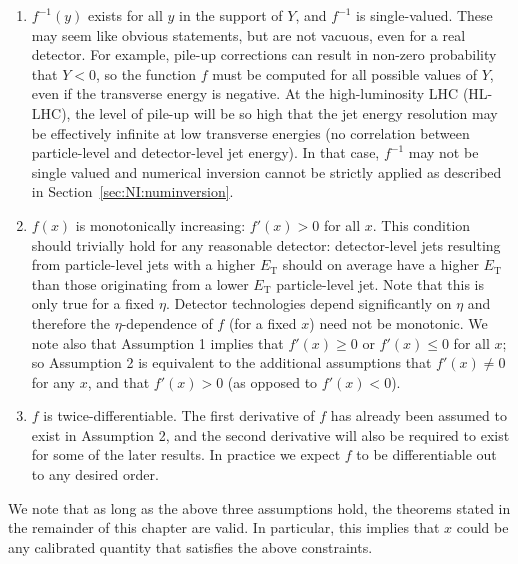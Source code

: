 \begin{enumerate}
\item $f^{-1}(y)$ exists for all $y$ in the support of $Y$, and $f^{-1}$ is single-valued.  These may seem like obvious statements, but are not vacuous, even for a real detector.  For example, pile-up corrections can result in non-zero probability that $Y<0$, so the function $f$ must be computed for all possible values of $Y$, even if the transverse energy is negative.  At the high-luminosity LHC (HL-LHC), the level of pile-up will be so high that the jet energy resolution may be effectively infinite at low transverse energies (no correlation between particle-level and detector-level jet energy).  In that case, $f^{-1}$ may not be single valued and numerical inversion cannot be strictly applied as described in Section~\ref{sec:NI:numinversion}.
\item $f(x)$ is monotonically increasing: $f'(x)>0$ for all $x$.  This condition should trivially hold for any reasonable detector: detector-level jets resulting from particle-level jets with a higher $E_\text{T}$ should on average have a higher $E_\text{T}$ than those originating from a lower $E_\text{T}$ particle-level jet.  Note that this is only true for a fixed $\eta$.  Detector technologies depend significantly on $\eta$ and therefore the $\eta$-dependence of $f$ (for a fixed $x$) need not be monotonic. We note also that Assumption 1 implies that $f'(x)\ge 0$ or $f'(x) \le 0$ for all $x$; so Assumption 2 is equivalent to the additional assumptions that $f'(x)\ne 0$ for any $x$, and that $f'(x)>0$ (as opposed to $f'(x)<0$).
\item $f$ is twice-differentiable. The first derivative of $f$ has already been assumed to exist in Assumption 2, and the second derivative will also be required to exist for some of the later results. In practice we expect $f$ to be differentiable out to any desired order.
\end{enumerate}

We note that as long as the above three assumptions hold, the theorems stated in the remainder of this chapter are valid.
In particular, this implies that $x$ could be any calibrated quantity that satisfies the above constraints.

